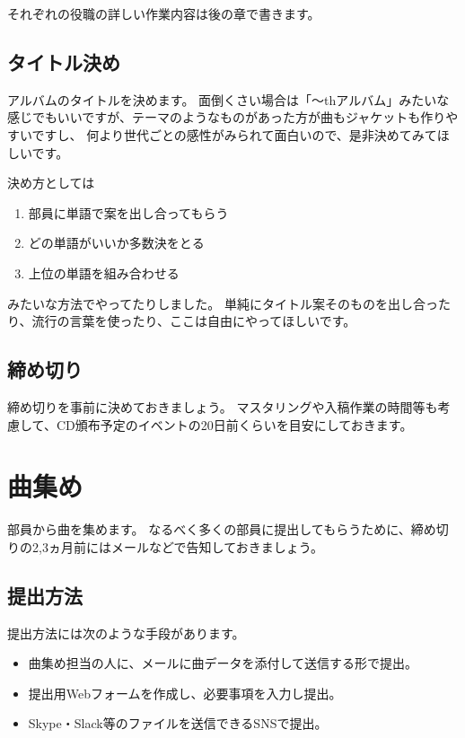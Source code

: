 \documentclass[11pt,a4paper]{jsarticle}
\begin{document}
            それぞれの役職の詳しい作業内容は後の章で書きます。

        \subsection{タイトル決め}
            アルバムのタイトルを決めます。
            面倒くさい場合は「～thアルバム」みたいな感じでもいいですが、テーマのようなものがあった方が曲もジャケットも作りやすいですし、
            何より世代ごとの感性がみられて面白いので、是非決めてみてほしいです。

            決め方としては
            \begin{enumerate}
                \item 部員に単語で案を出し合ってもらう
                \item どの単語がいいか多数決をとる
                \item 上位の単語を組み合わせる
            \end{enumerate}
            みたいな方法でやってたりしました。
            単純にタイトル案そのものを出し合ったり、流行の言葉を使ったり、ここは自由にやってほしいです。

        \subsection{締め切り}
            締め切りを事前に決めておきましょう。
            マスタリングや入稿作業の時間等も考慮して、CD頒布予定のイベントの20日前くらいを目安にしておきます。

    \section{曲集め}
        部員から曲を集めます。
        なるべく多くの部員に提出してもらうために、締め切りの2,3ヵ月前にはメールなどで告知しておきましょう。

        \subsection{提出方法}
            提出方法には次のような手段があります。
            \begin{itemize}
                \item 曲集め担当の人に、メールに曲データを添付して送信する形で提出。
                \item 提出用Webフォームを作成し、必要事項を入力し提出。
                \item Skype・Slack等のファイルを送信できるSNSで提出。
            \end{itemize}
            
\end{document}
